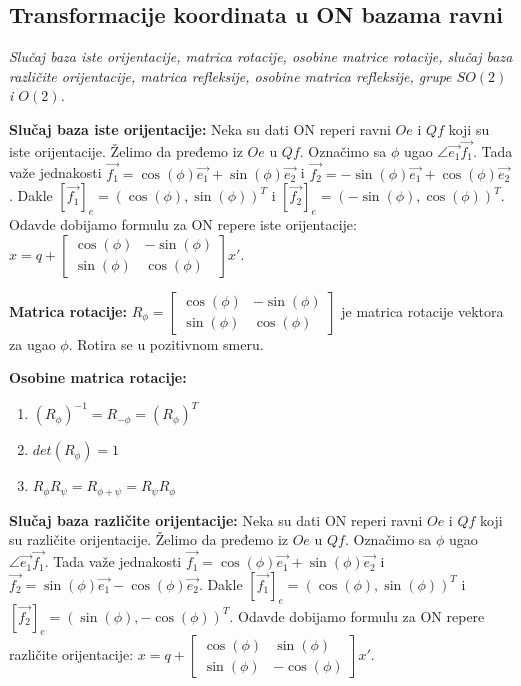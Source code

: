 \documentclass[12pt]{article}
\newcommand{\vek}[1]{\overrightarrow{#1}}
\begin{document}
\subsection{Transformacije koordinata u ON bazama ravni}
\label{subsec:pitanje_9}
\textit{Slučaj baza iste orijentacije, matrica rotacije, osobine matrice
    rotacije, slučaj baza različite orijentacije, matrica refleksije,
    osobine matrica refleksije, grupe $SO(2)$ i $O(2)$.}
\par
\vspace*{1cm}

\textbf{Slučaj baza iste orijentacije:} Neka su dati ON reperi ravni $Oe$ i
$Qf$ koji su iste orijentacije. Želimo da pređemo iz $Oe$ u $Qf$. Označimo sa
$\phi$ ugao $\angle{\vek{e_1}\vek{f_1}}$. Tada važe jednakosti
$\vek{f_1}=\cos(\phi)\vek{e_1}+\sin(\phi)\vek{e_2}$ i
$\vek{f_2}=-\sin(\phi)\vek{e_1}+\cos(\phi)\vek{e_2}$. Dakle
$[\vek{f_1}]_e=(\cos(\phi),\sin(\phi))^T$ i $[\vek{f_2}]_e
    =(-\sin(\phi),\cos(\phi))^T$. Odavde dobijamo formulu za ON repere iste
orijentacije: $x=q+\begin{bmatrix}
        \cos(\phi) & -\sin(\phi) \\
        \sin(\phi) & \cos(\phi)
    \end{bmatrix} x'$.
\par

\textbf{Matrica rotacije:} $R_\phi=\begin{bmatrix}
        \cos(\phi) & -\sin(\phi) \\
        \sin(\phi) & \cos(\phi)
    \end{bmatrix}$ je matrica rotacije vektora za ugao $\phi$. Rotira se u
pozitivnom smeru.
\par

\textbf{Osobine matrica rotacije:}
\begin{enumerate}[label=\textbf{(\arabic*)}]
    \item $(R_\phi)^{-1}=R_{-\phi}=(R_\phi)^T$
    \item $det(R_\phi)=1$
    \item $R_\phi R_\psi=R_{\phi+\psi}=R_\psi R_\phi$
\end{enumerate}
\par

\textbf{Slučaj baza različite orijentacije:} Neka su dati ON reperi ravni $Oe$
i $Qf$ koji su različite orijentacije. Želimo da pređemo iz $Oe$ u $Qf$.
Označimo sa $\phi$ ugao $\angle{\vek{e_1}\vek{f_1}}$. Tada važe jednakosti
$\vek{f_1}=\cos(\phi)\vek{e_1}+\sin(\phi)\vek{e_2}$ i
$\vek{f_2}=\sin(\phi)\vek{e_1}-\cos(\phi)\vek{e_2}$. Dakle
$[\vek{f_1}]_e=(\cos(\phi),\sin(\phi))^T$ i
$[\vek{f_2}]_e=(\sin(\phi),-\cos(\phi))^T$.
Odavde dobijamo formulu za ON repere različite orijentacije:
$x=q+\begin{bmatrix}
        \cos(\phi) & \sin(\phi)  \\
        \sin(\phi) & -\cos(\phi)
    \end{bmatrix} x'$.
\par
\end{document}

